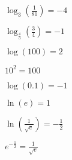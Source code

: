 \documentclass{ximera}
\begin{document}
\begin{question}
\begin{problem}
$\log_{3} \left(\frac{1}{81} \right) = -4$
\end{problem}

\begin{problem}
$\log_{\frac{4}{3}} \left(\frac{3}{4} \right) = -1$ 
\end{problem}

\begin{problem}
$\log(100) = 2$ 

\begin{solution}
$10^{2} = 100$
\end{solution}
\end{problem}

\begin{problem}
$\log (0.1) = -1$
\end{problem}

\begin{problem}
$\ln(e) = 1$ 
\end{problem}

\begin{problem}\label{rewritelastex}
$\ln\left(\frac{1}{\sqrt{e}}\right) = -\frac{1}{2}$   

\begin{solution}
$e^{-\frac{1}{2}} = \frac{1}{\sqrt{e}}$
\end{solution}
\end{problem}

\end{question}
\end{document}
